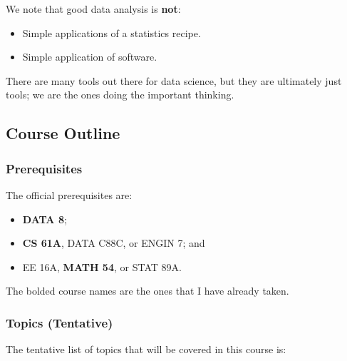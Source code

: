 \documentclass[openany]{book}
\begin{document}
We note that good data analysis is \textbf{not}:
\begin{itemize}
	\item Simple applications of a statistics recipe.
	\item Simple application of software.
\end{itemize}

There are many tools out there for data science, but they are ultimately just tools; we are the ones doing the important thinking.

\subsection{Course Outline}
\subsubsection{Prerequisites}
The official prerequisites are:
\begin{itemize}
	\item \textbf{DATA 8};
	\item \textbf{CS 61A}, DATA C88C, or ENGIN 7; and
	\item EE 16A, \textbf{MATH 54}, or STAT 89A.
\end{itemize}

The bolded course names are the ones that I have already taken.

\subsubsection{Topics (Tentative)}
The tentative list of topics that will be covered in this course is:
\end{document}
